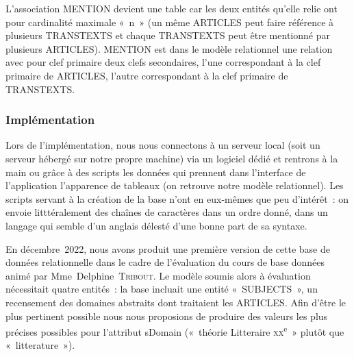 \documentclass[12pt, a4paper]{article}
\begin{document}
L'association MENTION devient une table car les deux entités qu'elle relie ont pour cardinalité maximale «~n~» (un même ARTICLES peut faire référence à plusieurs TRANSTEXTS et chaque TRANSTEXTS peut être mentionné par plusieurs ARTICLES). MENTION est dans le modèle relationnel une relation avec pour clef primaire deux clefs secondaires, l'une correspondant à la clef primaire de ARTICLES, l'autre correspondant à la clef primaire de TRANSTEXTS.


\subsubsection{Implémentation}
    Lors de l'implémentation, nous nous connectons à un serveur local (soit un serveur hébergé sur notre propre machine) via un logiciel dédié et rentrons à la main ou grâce à des scripts les données qui prennent dans l'interface de l'application l'apparence de tableaux (on retrouve notre modèle relationnel). Les scripts servant à la création de la base n'ont en eux-mêmes que peu d'intérêt~: on envoie litttéralement des chaînes de caractères dans un ordre donné, dans un langage qui semble d'un anglais délesté d'une bonne part de sa syntaxe.

  En décembre~2022, nous avons produit une première version de cette base de données relationnelle dans le cadre de l'évaluation du cours de base données animé par Mme~Delphine~\textsc{Tribout}. Le modèle soumis alors à évaluation nécessitait quatre entités~: la base incluait une entité «~SUBJECTS~», un recensement des domaines abstraits dont traitaient les ARTICLES. Afin d'être le plus pertinent possible nous nous proposions de produire des valeurs les plus précises possibles pour l'attribut sDomain («~théorie Litteraire \textsc{xx}\textsuperscript{e}~» plutôt que «~litterature~»).
\end{document}

